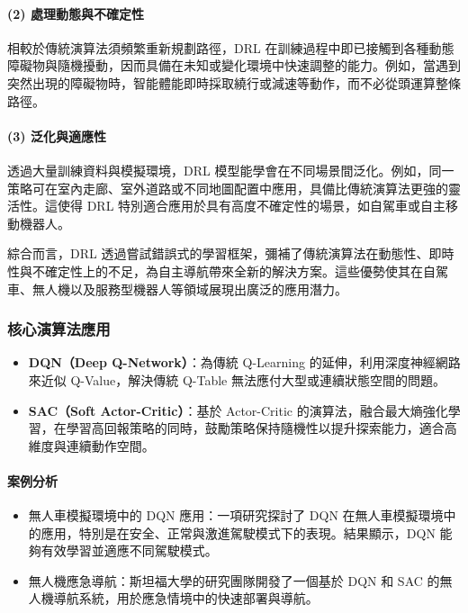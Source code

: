 \documentclass[12pt,a4paper]{article}
\begin{document}
\paragraph{(2) 處理動態與不確定性}
相較於傳統演算法須頻繁重新規劃路徑，DRL 在訓練過程中即已接觸到各種動態障礙物與隨機擾動，因而具備在未知或變化環境中快速調整的能力。例如，當遇到突然出現的障礙物時，智能體能即時採取繞行或減速等動作，而不必從頭運算整條路徑\cite{DRLAutonomous}\cite{PathPlanningMethod}。

\paragraph{(3) 泛化與適應性}
透過大量訓練資料與模擬環境，DRL 模型能學會在不同場景間泛化。例如，同一策略可在室內走廊、室外道路或不同地圖配置中應用，具備比傳統演算法更強的靈活性。這使得 DRL 特別適合應用於具有高度不確定性的場景，如自駕車或自主移動機器人\cite{DRLAutonomous}。
\\ \par
綜合而言，DRL 透過嘗試錯誤式的學習框架，彌補了傳統演算法在動態性、即時性與不確定性上的不足，為自主導航帶來全新的解決方案。這些優勢使其在自駕車、無人機以及服務型機器人等領域展現出廣泛的應用潛力。

\subsubsection{核心演算法應用}
\begin{itemize}
  \item \textbf{DQN（Deep Q-Network）}：為傳統 Q-Learning 的延伸，利用深度神經網路來近似 Q-Value，解決傳統 Q-Table 無法應付大型或連續狀態空間的問題\cite{DQN}。
  \item \textbf{SAC（Soft Actor-Critic）}：基於 Actor-Critic 的演算法，融合最大熵強化學習，在學習高回報策略的同時，鼓勵策略保持隨機性以提升探索能力，適合高維度與連續動作空間\cite{SAC}。
\end{itemize}

\paragraph{案例分析}
\begin{itemize}
  \item 無人車模擬環境中的 DQN 應用：一項研究探討了 DQN 在無人車模擬環境中的應用，特別是在安全、正常與激進駕駛模式下的表現。結果顯示，DQN 能夠有效學習並適應不同駕駛模式\cite{rybchak2024}。
  \item 無人機應急導航：斯坦福大學的研究團隊開發了一個基於 DQN 和 SAC 的無人機導航系統，用於應急情境中的快速部署與導航\cite{greenberg}。
\end{itemize}
\end{document}
